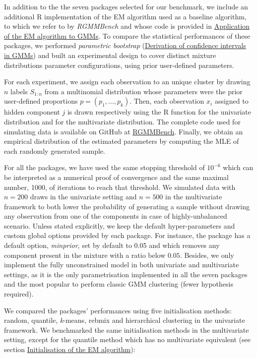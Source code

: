In addition to the the seven packages selected for our benchmark, we
include an additional R implementation of the EM algorithm used
as a baseline algorithm, to which we refer to by \emph{RGMMBench} and whose code is provided in \protect\hyperlink{application-of-the-em-algorithm-to-gmms}{Application of the EM algorithm to GMMs}. To compare the statistical performances of these packages, we performed \emph{parametric bootstrap} (\protect\hyperlink{derivation-of-confidence-intervals-in-gmms}{Derivation of confidence intervals
in GMMs}) and built an experimental design to cover distinct mixture distributions parameter configurations, using prior user-defined parameters.

For each experiment, we assign each observation to an unique cluster by drawing \(n\) labels \(S_{1:n}\) from a multinomial distribution whose parameters were the prior user-defined proportions \(p=(p_1, \ldots, p_k)\). Then, each observation \(x_i\) assigned to hidden component \(j\) is drawn respectively using the R function  for the univariate distribution and  for the multivariate distribution. The complete code used for simulating data is
available on GitHub at
\href{https://github.com/bastienchassagnol-servier/RGMMBench}{RGMMBench}. Finally, we obtain
an empirical distribution of the estimated parameters by computing the MLE
of each randomly generated sample.

For all the packages, we have used the same stopping threshold of
\(10^{-6}\) which can be interpreted as a numerical proof of convergence and the same maximal number, 1000, of iterations to reach that threshold. We simulated data with \(n = 200\) draws in the univariate setting and \(n=500\) in the multivariate framework to both lower the probability of generating a sample without drawing any observation from one of the components in case of highly-unbalanced scenario. Unless stated explicitly, we keep the default hyper-parameters and custom global options provided by each package. For instance, the  package has a default option, \emph{minprior}, set by default to 0.05 and which removes any component present in the mixture with a ratio below \(0.05\). Besides, we only implement the fully unconstrained model in both univariate and multivariate settings, as it is the only parametrisation implemented in all the seven packages and the most popular to perform classic GMM clustering (fewer hypothesis required).

We compared the packages' performances using five
initialisation methods: random, quantile, \emph{k}-means, rebmix and
hierarchical clustering in the univariate framework. We benchmarked the same initialisation methods in the multivariate setting, except for the quantile method which has no multivariate equivalent (see section \protect\hyperlink{initialisation-of-the-em-algorithm}{Initialisation of the EM algorithm}):

